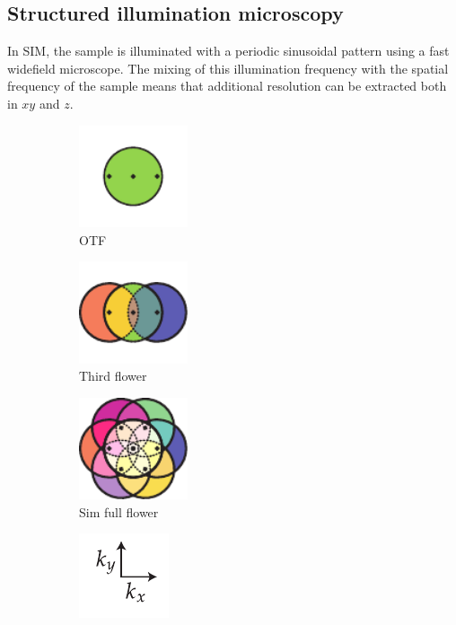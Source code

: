 \subsection{Structured illumination microscopy}

In SIM, the sample is illuminated with a periodic sinusoidal pattern using a fast widefield microscope.
The mixing of this illumination frequency with the spatial frequency of the sample means that additional resolution can be extracted both in $xy$ and $z$.

\begin{figure}
    \centering
    \begin{subfigure}[b]{0.25\textwidth}
        \centering
        \includegraphics[height=3cm]{./sim/otf}
        \caption{OTF}
        \label{fig:sim_otf}
    \end{subfigure}
    \begin{subfigure}[b]{0.25\textwidth}
        \centering
        \includegraphics[height=3cm]{./sim/third_flower}
        \caption{Third flower}
        \label{fig:sim_third_flower}
    \end{subfigure}
    \begin{subfigure}[b]{0.25\textwidth}
        \centering
        \includegraphics[height=3cm]{./sim/full_flower_alt}
        \caption{Sim full flower}
        \label{fig:sim_full_flower}
    \end{subfigure}
    \begin{subfigure}[b]{0.15\textwidth}
        \centering
        \includegraphics{./sim/xy_coordinates}

\end{subfigure}
\end{figure}
